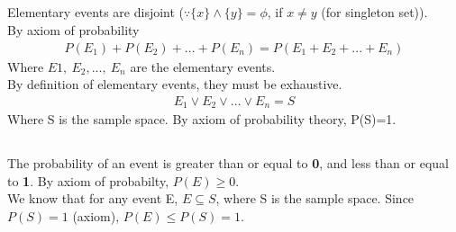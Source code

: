 \documentclass[journal,12pt,twocolumn]{IEEEtran}
\begin{document}
\subsection{}
Elementary events are disjoint ($\because \{x\}\land\{y\}=\phi$, if $x\neq y$ (for singleton set)).\\
By axiom of probability 
\begin{align}
	P(E_1)+P(E_2)+...+P(E_n)=P(E_1+ E_2+ ...+ E_n)
\end{align}
Where $E1,\ E_2,...,\ E_n$ are the elementary events.\\
By definition of elementary events, they must be exhaustive.
\begin{align}
	E_1\lor E_2\lor ...\lor E_n=S
\end{align}
Where S is the sample space. By axiom of probability theory, P(S)=1.
\subsection{}
The probability of an event is greater than or equal to \textbf{0}, and less than or equal to \textbf{1}.
By axiom of probabilty, $P(E)\geq 0$.\\
We know that for any event E, $E\subseteq S$, where S is the sample space. Since $P(S)=1$ (axiom), $P(E)\leq P(S)=1$.\\
\end{document}
